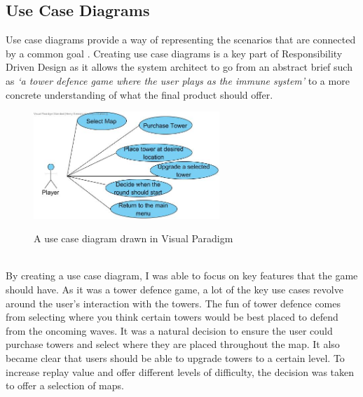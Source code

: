 \documentclass[a4paper,12pt]{article}
\begin{document}
\subsection*{Use Case Diagrams}
Use case diagrams provide a way of representing the scenarios that are connected by a common goal \cite{UML-Distilled}. Creating use case diagrams is a key part of Responsibility Driven Design as it allows the system architect to go from an abstract brief such as \textit{`a tower defence game where the user plays as the immune system'} to a more concrete understanding of what the final product should offer. 
\begin{figure}[h!]
	\begin{center}
		\includegraphics[width=7cm, origin=h]{images/Use-Case.jpg}
		\\
		\caption{A use case diagram drawn in Visual Paradigm}
	\end{center}
\end{figure}
\\
By creating a use case diagram, I was able to focus on key features that the game should have. As it was a tower defence game, a lot of the key use cases revolve around the user's interaction with the towers. The fun of tower defence comes from selecting where you think certain towers would be best placed to defend from the oncoming waves. It was a natural decision to ensure the user could purchase towers and select where they are placed throughout the map. It also became clear that users should be able to upgrade towers to a certain level. To increase replay value and offer different levels of difficulty, the decision was taken to offer a selection of maps.
\end{document}
